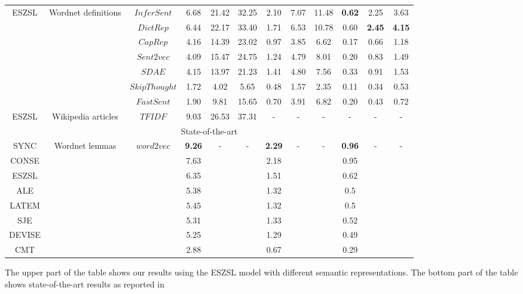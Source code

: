 \begin{table*}[t]
\begin{tabular}{c c c c c c c c c c c c }
\hline	
\multirow{7}{*}{ESZSL}& \multirow{7}{*}{Wordnet definitions} &$InferSent$ &  6.68  &  21.42  &  32.25  &  2.10  &  7.07  &  11.48  &  \textbf{0.62} &  2.25 &  3.63 \\
&  &$DictRep$           &  6.44 &  22.17 & 33.40  & 1.71  & 6.53  & 10.78  & 0.60  &  \textbf{2.45}   &  \textbf{4.15}  \\
&  &$CapRep$            &  4.16 &  14.39 & 23.02  & 0.97  & 3.85  & 6.62   & 0.17  &  0.66   &  1.18  \\
&  &$Sent2vec$          &  4.09 &  15.47 & 24.75  & 1.24  & 4.79  & 8.01   & 0.20  &  0.83   &  1.49 \\
&  &$SDAE$              &  4.15 &  13.97 & 21.23  & 1.41  & 4.80  & 7.56   & 0.33  &  0.91   &  1.53 \\
&  &$SkipThought$       &  1.72 &   4.02 &  5.65  & 0.48  & 1.57  & 2.35   & 0.11  &  0.34   &  0.53 \\
&  &$FastSent$          &  1.90 &   9.81 & 15.65  & 0.70  & 3.91  & 6.82   & 0.20  &  0.43   &  0.72 \\
\hline
\multirow{1}{*}{ESZSL}& \multirow{1}{*}{Wikipedia articles} & $TFIDF$ & 9.03  & 26.53  &  37.31  &  - & -  & -  &  - &  - & - \\	
\hline	
\multicolumn{12}{c}{State-of-the-art}	 \\
\hline	
SYNC \cite{changpinyo2016synthesized} & \multirow{8}{*}{Wordnet lemmas} & \multirow{8}{*}{$word2vec$} & \textbf{9.26} &  \multirow{8}{*}{-} &  \multirow{8}{*}{-} & \textbf{2.29} &  \multirow{8}{*}{-} &  \multirow{8}{*}{-} & \textbf{0.96} &  \multirow{8}{*}{-} &  \multirow{8}{*}{-} \\
CONSE \cite{norouzi2013zero} &   &  & 7.63 &  &  & 2.18 &  &  & 0.95 &  &  \\
ESZSL \cite{romera2015embarrassingly} &   &  & 6.35 &  &  & 1.51 &  &  & 0.62 &  &  \\
ALE  \cite{akata2016label} &   &  & 5.38 &  &  & 1.32 &  &  & 0.5 &  &  \\
LATEM \cite{xian2016latent}&   &  & 5.45 &  &  & 1.32 &  &  & 0.5 &  &  \\
SJE \cite{akata2015evaluation}  &   &  & 5.31 &  &  & 1.33 &  &  & 0.52 &  &  \\
DEVISE\cite{frome2013devise}&   &  & 5.25 &  &  & 1.29 &  &  & 0.49 &  &  \\
CMT  \cite{socher2013zero} &   &  & 2.88 &  &  & 0.67 &  &  & 0.29 &  &  \\
\hline
\end{tabular}
The upper part of the table shows our results using the ESZSL model with different semantic representations. The bottom part of the table shows state-of-the-art results as reported in \cite{xian2017zero}
\end{table*}

